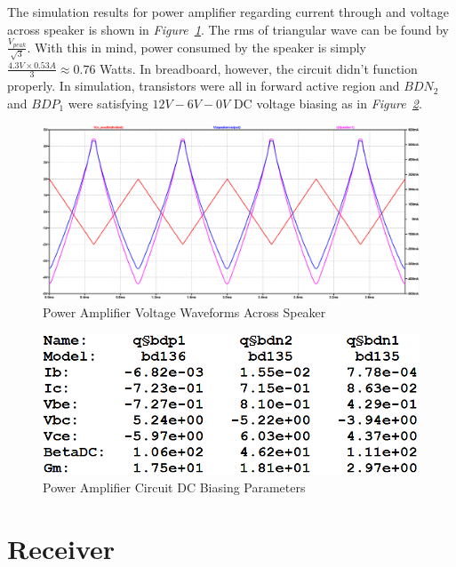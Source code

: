 \documentclass[paper]{IEEEtran}
\begin{document}
The simulation results for power amplifier regarding current through and voltage across speaker is shown in \textit{Figure~\ref{fig:PowerAmp_speakerOutput}}. The rms of triangular wave can be found by $\frac{V_{peak}}{\sqrt{3}}$. With this in mind, power consumed by the speaker is simply $\frac{4.3V\times0.53A}{3}\approx0.76$ Watts. In breadboard, however, the circuit didn't function properly. In simulation, transistors were all in forward active region and $BDN_{2}$ and $BDP_{1}$ were satisfying $12V-6V-0V$ DC voltage biasing as in \textit{Figure~\ref{fig:PowerAmp_Circuit_dcParameters}}.
\begin{figure}[t!]
	\setlength{\unitlength}{\textwidth}
	\center 
	\includegraphics[width=0.48\unitlength]{PowerAmp_speakerOutput}
	\caption{\label{fig:PowerAmp_speakerOutput}Power Amplifier Voltage Waveforms Across Speaker}
\end{figure}
\begin{figure}[t!]
	\setlength{\unitlength}{\textwidth}
	\center 
	\includegraphics[width=0.45\unitlength]{PowerAmp_Circuit_dcParameters}
	\caption{\label{fig:PowerAmp_Circuit_dcParameters}Power Amplifier Circuit DC Biasing Parameters}
\end{figure}

\section{Receiver}
\end{document}
